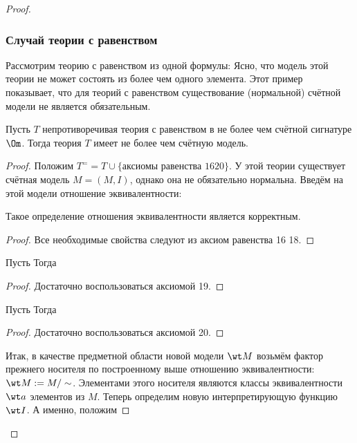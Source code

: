 \documentclass[a4paper,draft]{article}
\def\fora#1{\fa#1\,}
\begin{document}
\begin{proof}
\subsubsection{Случай теории с равенством}
\begin{ex}
Рассмотрим теорию с равенством из одной формулы:
\equ{\fora x\fora y\, x=y.}
Ясно, что модель этой теории не может состоять из более чем одного элемента. Этот пример показывает,
что для теорий с равенством существование (нормальной) счётной модели не является обязательным.
\end{ex}
\begin{theorem}
Пусть $T$ непротиворечивая теория с равенством в не более чем счётной
сигнатуре $\Om$. Тогда теория $T$ имеет не более чем счётную модель.
\end{theorem}
\begin{proof}
Положим $T^==T\cup\{\text{аксиомы равенства 1620}\}$. У этой теории существует счётная модель $M=(M,I)$,
однако она не обязательно нормальна. Введём на этой модели отношение эквивалентности:
\begin{stm}
Такое определение отношения эквивалентности является корректным.
\end{stm}
\begin{proof}
Все необходимые свойства следуют из аксиом равенства 16 18.
\end{proof}
\begin{stm}
Пусть
Тогда
\end{stm}
\begin{proof}
Достаточно воспользоваться аксиомой 19.
\end{proof}
\begin{stm}
Пусть
Тогда
\end{stm}
\begin{proof}
Достаточно воспользоваться аксиомой 20.
\end{proof}
Итак, в качестве предметной области новой модели $\wt M$ возьмём фактор прежнего носителя
по построенному выше отношению эквивалентности: $\wt M:=M/\sim$. Элементами этого носителя
являются классы эквивалентности $\wt a$ элементов из $M$.
Теперь определим новую интерпретирующую функцию $\wt I$. А именно, положим
\end{proof}
\end{proof}
\end{document}
